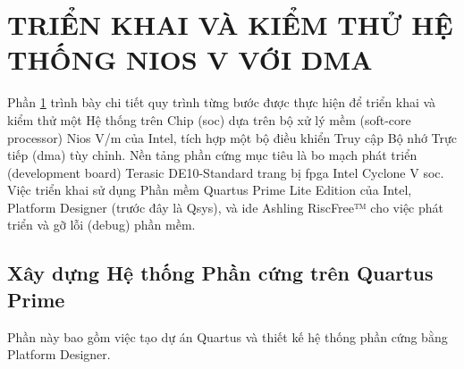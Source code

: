 \section{TRIỂN KHAI VÀ KIỂM THỬ HỆ THỐNG NIOS V VỚI DMA}
\label{sec:chapter3_content} %
Phần \ref{sec:chapter3_content} trình bày chi tiết quy trình từng bước được thực hiện để triển khai và kiểm thử một Hệ thống trên Chip (\acrshort{soc}) dựa trên bộ xử lý mềm (soft-core processor) Nios V/m của Intel, tích hợp một bộ điều khiển Truy cập Bộ nhớ Trực tiếp (\acrfull{dma}) tùy chỉnh. Nền tảng phần cứng mục tiêu là bo mạch phát triển (development board) Terasic DE10-Standard \cite{terasicDE10Std} trang bị \acrshort{fpga} Intel Cyclone V \acrshort{soc}. Việc triển khai sử dụng Phần mềm Quartus Prime Lite Edition của Intel, Platform Designer (trước đây là Qsys), và \acrshort{ide} Ashling RiscFree™ \cite{ashling_riscfree_guide} cho việc phát triển và gỡ lỗi (debug) phần mềm.
\subsection{Xây dựng Hệ thống Phần cứng trên Quartus Prime}
\label{sec:build_hardware}

Phần này bao gồm việc tạo dự án Quartus và thiết kế hệ thống phần cứng bằng Platform Designer.

